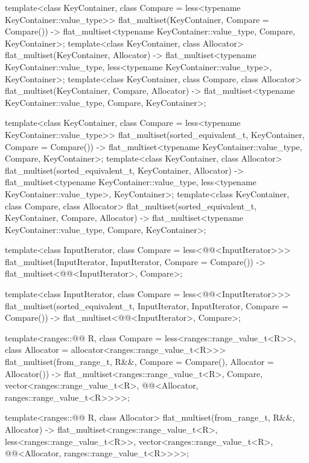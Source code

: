 \begin{codeblock}
{  template<class KeyContainer, class Compare = less<typename KeyContainer::value_type>>
    flat_multiset(KeyContainer, Compare = Compare())
      -> flat_multiset<typename KeyContainer::value_type, Compare, KeyContainer>;
  template<class KeyContainer, class Allocator>
    flat_multiset(KeyContainer, Allocator)
      -> flat_multiset<typename KeyContainer::value_type,
                       less<typename KeyContainer::value_type>, KeyContainer>;
  template<class KeyContainer, class Compare, class Allocator>
    flat_multiset(KeyContainer, Compare, Allocator)
      -> flat_multiset<typename KeyContainer::value_type, Compare, KeyContainer>;

  template<class KeyContainer, class Compare = less<typename KeyContainer::value_type>>
    flat_multiset(sorted_equivalent_t, KeyContainer, Compare = Compare())
      -> flat_multiset<typename KeyContainer::value_type, Compare, KeyContainer>;
  template<class KeyContainer, class Allocator>
    flat_multiset(sorted_equivalent_t, KeyContainer, Allocator)
      -> flat_multiset<typename KeyContainer::value_type,
                       less<typename KeyContainer::value_type>, KeyContainer>;
  template<class KeyContainer, class Compare, class Allocator>
    flat_multiset(sorted_equivalent_t, KeyContainer, Compare, Allocator)
      -> flat_multiset<typename KeyContainer::value_type, Compare, KeyContainer>;

  template<class InputIterator, class Compare = less<@@<InputIterator>>>
    flat_multiset(InputIterator, InputIterator, Compare = Compare())
      -> flat_multiset<@@<InputIterator>, Compare>;

  template<class InputIterator, class Compare = less<@@<InputIterator>>>
    flat_multiset(sorted_equivalent_t, InputIterator, InputIterator, Compare = Compare())
      -> flat_multiset<@@<InputIterator>, Compare>;

  template<ranges::@@ R, class Compare = less<ranges::range_value_t<R>>,
           class Allocator = allocator<ranges::range_value_t<R>>>
    flat_multiset(from_range_t, R&&, Compare = Compare(), Allocator = Allocator())
      -> flat_multiset<ranges::range_value_t<R>, Compare,
                       vector<ranges::range_value_t<R>,
                              @@<Allocator, ranges::range_value_t<R>>>>;

  template<ranges::@@ R, class Allocator>
    flat_multiset(from_range_t, R&&, Allocator)
      -> flat_multiset<ranges::range_value_t<R>, less<ranges::range_value_t<R>>,
                       vector<ranges::range_value_t<R>,
                              @@<Allocator, ranges::range_value_t<R>>>>;

}
\end{codeblock}
